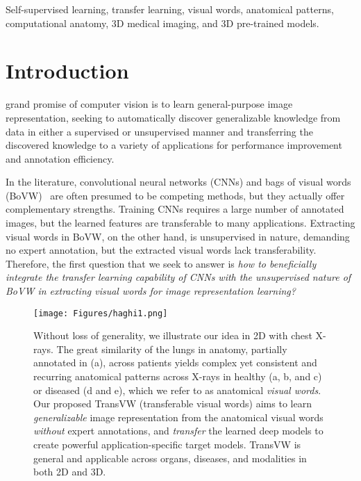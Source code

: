 \documentclass[journal,twoside,web]{ieeecolor}
\begin{document}
\begin{IEEEkeywords}
Self-supervised learning, transfer learning, visual words, anatomical patterns, computational anatomy, 3D medical imaging, and 3D pre-trained models.
\end{IEEEkeywords}

\section{Introduction}
\label{sec:introduction}
 grand promise of computer vision is to learn general-purpose image representation, seeking to automatically discover generalizable knowledge from data in either a supervised or unsupervised manner and transferring the discovered knowledge to a variety of applications for performance improvement and annotation efficiency. 

In the literature, convolutional neural networks (CNNs) and bags of visual words (BoVW)~\cite{Sivic2003Video} are often presumed to be competing methods, but they actually offer complementary strengths. Training CNNs requires a large number of annotated images, but the learned features are transferable to many applications. Extracting visual words in BoVW, on the other hand, is unsupervised in nature, demanding no expert annotation, but the extracted visual words lack transferability. Therefore, the first question that we seek to answer is \textit{how to beneficially integrate the transfer learning capability of CNNs with the unsupervised nature of BoVW in extracting visual words for image representation learning?}



\begin{figure}[t]
\centerline{\texttt{[image: Figures/haghi1.png]}}
\caption{ Without loss of generality, we illustrate our idea in 2D with chest X-rays. The great similarity of the lungs in anatomy, partially annotated in (a), across patients yields complex yet consistent and recurring anatomical patterns across X-rays in healthy (a, b, and c) or diseased (d and e), which we  refer to as anatomical \textit{visual words}. Our proposed TransVW (transferable visual words) aims to learn {\em generalizable} image representation from the anatomical visual words {\em without} expert annotations, and {\em transfer} the learned deep models to create powerful application-specific target models. TransVW is general and applicable across organs, diseases, and modalities in both 2D and 3D.}
\label{fig:annotated_xray}
\end{figure}
\end{document}
